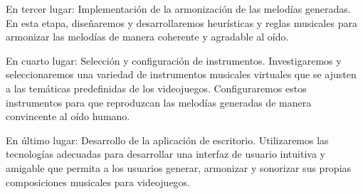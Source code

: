 En tercer lugar: Implementación de la armonización de las melodías generadas. En esta etapa, diseñaremos y desarrollaremos heurísticas y reglas musicales para armonizar las melodías de manera coherente y agradable al oído.

En cuarto lugar: Selección y configuración de instrumentos. Investigaremos y seleccionaremos una variedad de instrumentos musicales virtuales que se ajusten a las temáticas predefinidas de los videojuegos. Configuraremos estos instrumentos para que reproduzcan las melodías generadas de manera convincente al oído humano.

En último lugar: Desarrollo de la aplicación de escritorio. Utilizaremos las tecnologías adecuadas para desarrollar una interfaz de usuario intuitiva y amigable que permita a los usuarios generar, armonizar y sonorizar sus propias composiciones musicales para videojuegos.


\lipsum[0]